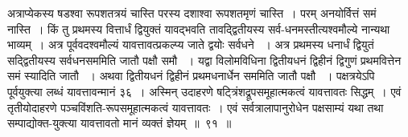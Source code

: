 \documentclass[11pt, openany]{book}
\begin{document}
\begin{sloppypar}
अत्राप्येकस्य षडश्वा रूपशतत्रयं चास्ति परस्य दशाश्वा रूपशतमृणं चास्ति~। परम् अनयोर्वित्तं समं नास्ति~। किं तु प्रथमस्य वित्तार्धं द्वियुक्तं यावद्भवति तावद्द्वितीयस्य सर्व-धनमस्तीत्यश्वमौल्ये नान्यथा भाव्यम्~। अत्र पूर्ववदश्वमौल्यं यावत्तावत्प्रकल्प्य जाते द्वयोः सर्वधने ~। अत्र प्रथमस्य धनार्धं द्वियुतं सद्द्वितीयस्य सर्वधनसममिति जातौ पक्षौ समौ ~। यद्वा विलोमविधिना द्वितीयधनं द्विहीनं द्विगुणं प्रथमवित्तेन समं स्यादिति जातौ ~। अथवा द्वितीयधनं द्विहीनं प्रथमधनार्धेन सममिति जातौ पक्षौ ~। पक्षत्रयेऽपि पूर्वयुक्त्या लब्धं यावत्तावन्मानं ३६~। अस्मिन् उदाहरणे षट्त्रिंशद्रूपसमूहात्मकत्वं यावत्तावतः सिद्धम्~। एवं तृतीयोदाहरणे पञ्चविंशति-रूपसमूहात्मकत्वं यावत्तावतः~। एवं सर्वत्रालापानुरोधेन पक्षसाम्यं यथा तथा सम्पाद्योक्त-युक्त्या यावत्तावतो मानं व्यक्तं ज्ञेयम्~॥~९१~॥
\end{sloppypar}

\newpage
\end{document}
